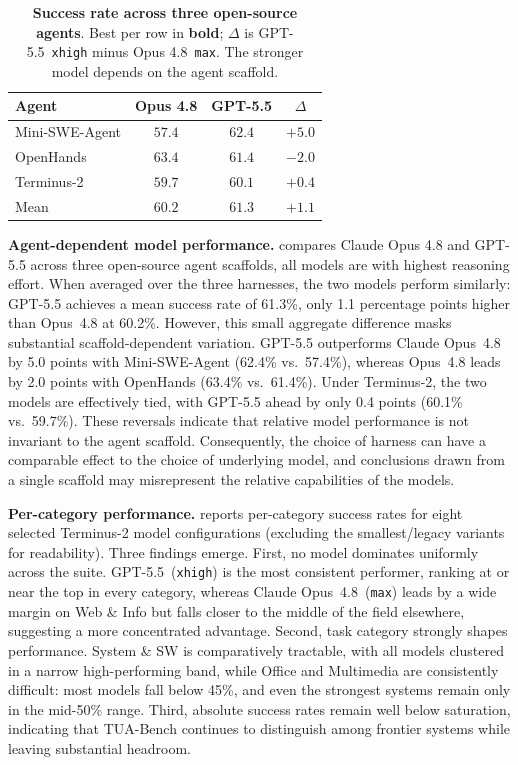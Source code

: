 \documentclass{llmxive}
\begin{document}
\begin{table}[t]
\centering
  \small
  \vspace{-\baselineskip}
  \begin{tabular}{l c c c}
    \toprule
    Agent & Opus 4.8 & GPT-5.5 & $\Delta$ \\
    \midrule
    Mini-SWE-Agent & $57.4$          & $\mathbf{62.4}$ & $+5.0$ \\
    OpenHands  & $\mathbf{63.4}$ & $61.4$          & $-2.0$ \\
    Terminus-2     & $59.7$          & $\mathbf{60.1}$ & $+0.4$ \\
    \midrule
    Mean           & $60.2$          & $\mathbf{61.3}$ & $+1.1$ \\
    \bottomrule
  \end{tabular}

\caption{\textbf{Success rate across three open-source agents}. Best per row in \textbf{bold}; $\Delta$ is GPT-5.5~\texttt{xhigh} minus Opus 4.8~\texttt{max}. The stronger model depends on the agent scaffold.}
\label{tab:model-comparison}
\end{table}

\noindent\textbf{Agent-dependent model performance.}
 compares Claude Opus 4.8 and GPT-5.5 across three open-source agent scaffolds, all models are with highest reasoning effort. When averaged over the three harnesses, the two models perform similarly: GPT-5.5 achieves a mean success rate of 61.3\%, only 1.1 percentage points higher than Opus~4.8 at 60.2\%. However, this small aggregate difference masks substantial scaffold-dependent variation. GPT-5.5 outperforms Claude Opus~4.8 by 5.0 points with Mini-SWE-Agent (62.4\% vs.\ 57.4\%), whereas Opus~4.8 leads by 2.0 points with OpenHands (63.4\% vs.\ 61.4\%). Under Terminus-2, the two models are effectively tied, with GPT-5.5 ahead by only 0.4 points (60.1\% vs.\ 59.7\%). These reversals indicate that relative model performance is not invariant to the agent scaffold. Consequently, the choice of harness can have a comparable effect to the choice of underlying model, and conclusions drawn from a single scaffold may misrepresent the relative capabilities of the models.


\noindent\textbf{Per-category performance.}  reports per-category success rates for eight selected Terminus-2 model configurations (excluding the smallest/legacy variants for readability). Three findings emerge. First, no model dominates uniformly across the suite. GPT-5.5~(\texttt{xhigh}) is the most consistent performer, ranking at or near the top in every category, whereas Claude Opus~4.8~(\texttt{max}) leads by a wide margin on Web \& Info but falls closer to the middle of the field elsewhere, suggesting a more concentrated advantage. Second, task category strongly shapes performance. System \& SW is comparatively tractable, with all models clustered in a narrow high-performing band, while Office and Multimedia are consistently difficult: most models fall below 45\%, and even the strongest systems remain only in the mid-50\% range. Third, absolute success rates remain well below saturation, indicating that TUA-Bench continues to distinguish among frontier systems while leaving substantial headroom. 
\end{document}
